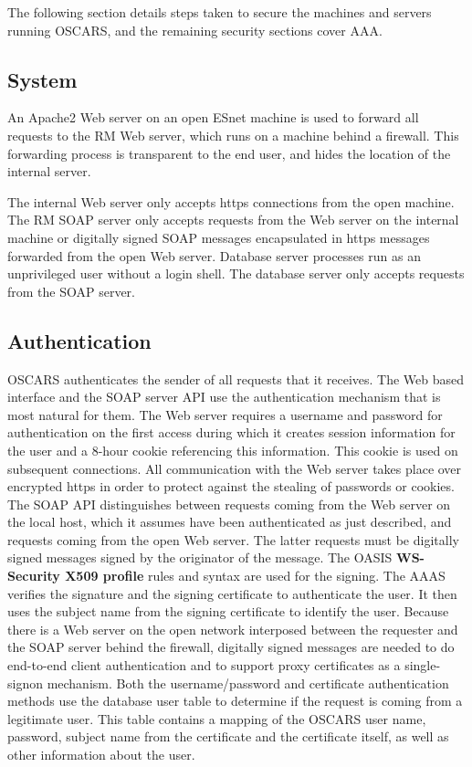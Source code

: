 \documentclass[conference]{IEEEtran}
\begin{document}
The following section details steps taken to secure the machines and 
servers running OSCARS, and the remaining security sections cover AAA.

\subsection{System}

An Apache2 Web server on an open ESnet machine is used to forward all 
requests to the RM Web server, which runs on a machine behind a firewall. 
This forwarding process is transparent to the end user, and hides the location 
of the internal server.

The internal Web server only accepts https connections from the open machine.
The RM SOAP server only accepts requests from the Web server on the internal 
machine
or digitally signed SOAP messages encapsulated in https messages forwarded from the open Web server.
Database server processes run as an unprivileged user without a login 
shell.  The database server only accepts requests from the SOAP server.


\subsection{Authentication}
OSCARS authenticates the sender of all requests that it receives.
The Web based interface and the SOAP server API use the
authentication mechanism that is most natural for them. The Web server
requires a username and password for authentication on the first
access during which it creates session information for the user and a
8-hour cookie referencing this information. This cookie is used on subsequent
connections. All communication with the Web server takes place over
encrypted https in order to protect against the stealing of passwords
or cookies. The SOAP API distinguishes between requests coming from
the Web server on the local host, which it assumes have been authenticated
as just described, and requests coming from the open Web server. The 
latter requests must be digitally signed messages signed by the
originator of the message.  The OASIS \textbf{WS-Security X509 profile} rules and syntax are used 
for the signing.
The AAAS verifies the signature and the signing certificate to authenticate
the user. It then uses the subject name from the signing certificate
to identify the user. Because there is a Web server on the open network 
interposed between the
requester and the SOAP server behind the firewall, digitally signed messages 
are 
needed to do end-to-end client authentication and to support proxy certificates
as a single-signon mechanism. Both the username/password and certificate 
authentication methods use the database user table to
determine if the request is coming from a legitimate user. This table
contains a mapping of the OSCARS user name, password, subject name
from the certificate and the certificate itself, as well as other
information about the user.
\end{document}
